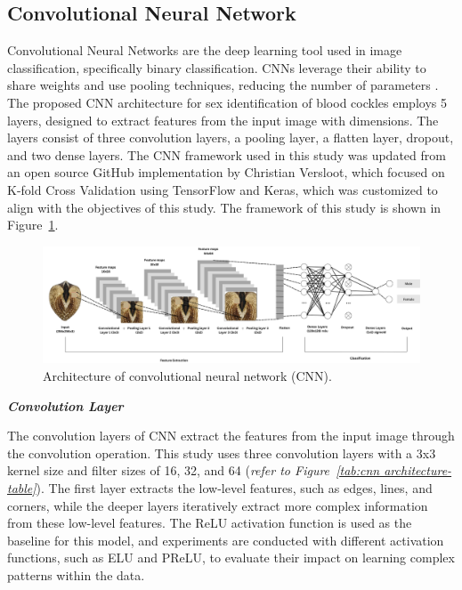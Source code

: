 \subsection{Convolutional Neural Network}

Convolutional Neural Networks are the deep learning tool used in image classification, specifically binary classification. CNNs leverage their ability to share weights and use pooling techniques, reducing the number of parameters \cite{cui2020}. The proposed CNN architecture for sex identification of blood cockles employs 5 layers, designed to extract features from the input image with dimensions. The layers consist of three convolution layers, a pooling layer, a flatten layer, dropout, and two dense layers. The CNN framework used in this study was updated from an open source GitHub implementation by Christian Versloot, which focused on K-fold Cross Validation using TensorFlow and Keras, which was customized to align with the objectives of this study. The framework of this study is shown in Figure~\ref{fig:cnn_architecture}.


\begin{figure}[h]
	\centering
	\includegraphics[width=\textwidth]{figures/cnn_architecture.png}
	\caption{Architecture of convolutional neural network (CNN).}
	\label{fig:cnn_architecture}
\end{figure}

\textbf{\textit{Convolution Layer}}

The convolution layers of CNN extract the features from the input image through the convolution operation. This study uses three convolution layers with a 3x3 kernel size and filter sizes of 16, 32, and 64 (\textit{refer to Figure~\ref{tab:cnn architecture-table}}). The first layer extracts the low-level features, such as edges, lines, and corners, while the deeper layers iteratively extract more complex information from these low-level features. The ReLU activation function is used as the baseline for this model, and experiments are conducted with different activation functions, such as ELU and PReLU, to evaluate their impact on learning complex patterns within the data.

